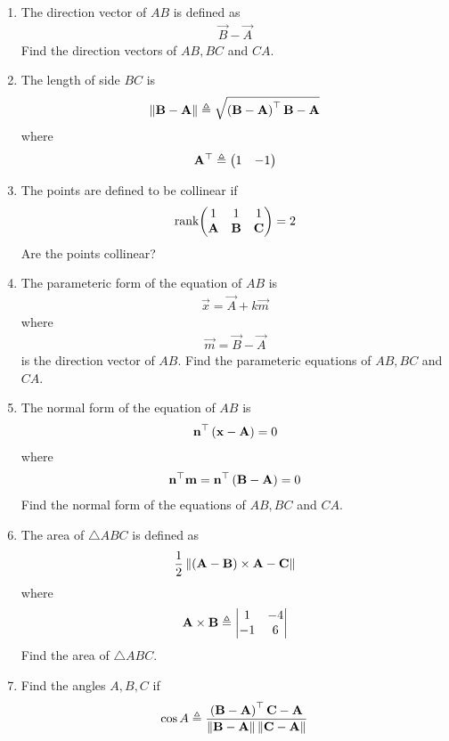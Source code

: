 \begin{enumerate}[label=\thesection.\arabic*.,ref=\thesection.\theenumi]
\item The direction vector of $AB$ is defined as
		\begin{align}
			\vec{B}-
			\vec{A}
		\end{align}
Find the direction vectors of $AB, BC$ and $CA$.
	\item The length of side $BC$ is 
		\begin{align}
			\left\lVert\mathbf{B}-\mathbf{A}\right\rVert \triangleq \sqrt{\left(\mathbf{B}-\mathbf{A}\right)^{\top}{\mathbf{B}-\mathbf{A}}}
		\end{align}
		where
		\begin{align}
			\mathbf{A}^{\top}\triangleq\begin{pmatrix}1 & -1\end{pmatrix}
		\end{align}
\item   The points are defined to be collinear if 
		\begin{align}
			\text{rank}{\ensuremath{\begin{pmatrix}1 & 1 & 1 \\ \mathbf{A}& \mathbf{B}&\mathbf{C}\end{pmatrix}}} = 2
		\end{align}
Are the points collinear?
\item The parameteric form of the equation  of $AB$ is 
		\begin{align}
			\vec{x}=\vec{A}+k\vec{m}
		\end{align}
		where
		\begin{align}
\vec{m}=\vec{B}-\vec{A}
		\end{align}
is the direction vector of $AB$.
Find the parameteric equations of $AB, BC$ and $CA$.
\item The normal form of the equation of $AB$  is 
		\begin{align}
			\mathbf{n}^{\top}\left(	\mathbf{x}-\mathbf{A}\right) = 0
		\end{align}
		where 
		\begin{align}
			\mathbf{n}^{\top}\mathbf{m}=\mathbf{n}^{\top}\left(\mathbf{B}-\mathbf{A}\right) = 0
		\end{align}
Find the normal form of the equations of $AB, BC$ and $CA$.
\item The area of $\triangle ABC$ is defined as
		\begin{align}
			\frac{1}{2}\left\lVert{\ensuremath{\left(\mathbf{A}-\mathbf{B}\right)}\times {\mathbf{A}-\mathbf{C}}}\right\rVert
		\end{align}
		where
		\begin{align}
			\mathbf{A}\times\mathbf{B} \triangleq \begin{vmatrix}1 & -4 \\-1 & 6\end{vmatrix}
		\end{align}
		Find the area of $\triangle ABC$.
	\item Find the angles $A, B, C$ if 
    \label{prop:angle2d}
  \begin{align}
    \label{eq:angle2d}
			\cos A \triangleq 
\frac{\brak{\vec{B}-\vec{A}}^{\top}{\vec{C}-\vec{A}}}{\norm{\vec{B}-\vec{A}}\norm{\vec{C}-\vec{A}}}
  \end{align}
\end{enumerate}
